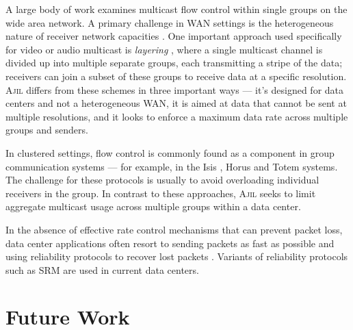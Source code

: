 \documentclass[times, 10pt,twocolumn]{article}
\newcommand{\sysname}{\textsc{Ajil}}
\begin{document}



 \label{sec:policy}




 \label{sec:eval}



 \label{sec:related}

A large body of work examines multicast flow control within single groups on the wide area network. A primary challenge in WAN settings is the heterogeneous nature of receiver network capacities \cite{gau2002mfc}. One important approach used specifically for video or audio multicast is \textit{layering} \cite{Mccanne96layered, bhattacharyya1998emf, vicisano98tlc}, where a single multicast channel is divided up into multiple separate groups, each transmitting a stripe of the data; receivers can join a subset of these groups to receive data at a specific resolution. \sysname{} differs from these schemes in three important ways --- it's designed for data centers and not a heterogeneous WAN, it is aimed at data that cannot be sent at multiple resolutions, and it looks to enforce a maximum data rate across multiple groups and senders.

In clustered settings, flow control is commonly found as a component in group communication systems --- for example, in the Isis \cite{birman1993pga}, Horus \cite{vanrenesse1996hfg} and Totem \cite{moser1996tft} systems. The challenge for these protocols is usually to avoid overloading individual receivers in the group. In contrast to these approaches, \sysname{} seeks to limit aggregate multicast usage across multiple groups within a data center.

In the absence of effective rate control mechanisms that can prevent packet loss, data center applications often resort to sending packets as fast as possible and using reliability protocols to recover lost packets \cite{ricochet}. Variants of reliability protocols such as SRM \cite{sallysrm} are used in current data centers.

\section{Future Work} \label{sec:future}
\end{document}
